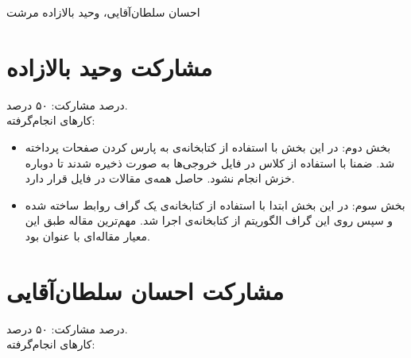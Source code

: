 \documentclass[11pt]{article}
\begin{document}
%
{احسان سلطان‌آقایی، وحید بالازاده مرشت}

\section*{مشارکت وحید بالازاده}
درصد مشارکت: ۵۰ درصد.\\

کارهای انجام‌گرفته:
\begin{itemize}
\item بخش دوم: در این بخش با استفاده از کتابخانه‌ی  به پارس کردن صفحات  پرداخته شد. ضمنا با استفاده از کلاس  در فایل  خروجی‌ها به صورت  ذخیره شدند تا دوباره خزش انجام نشود. حاصل همه‌ی مقالات در فایل  قرار دارد.
\item بخش سوم: در این بخش ابتدا با استفاده از کتابخانه‌ی  یک گراف روابط ساخته شده و سپس روی این گراف الگوریتم  از کتابخانه‌ی  اجرا شد. مهم‌ترین مقاله طبق این معیار مقاله‌ای با عنوان  بود.
\end{itemize}
\section*{مشارکت احسان سلطان‌آقایی}
درصد مشارکت: ۵۰ درصد.\\

کارهای انجام‌گرفته:
\end{document}
